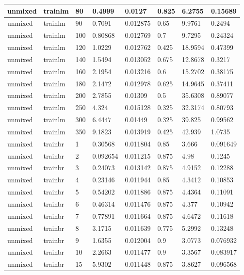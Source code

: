 \begin{longtable}{llllllll}
unmixed & trainlm & 80 & 0.4999 & 0.0127 & 0.825 & 6.2755 & 0.15689 \\ \hline 
unmixed & trainlm & 90 & 0.7091 & 0.012875 & 0.65 & 9.9761 & 0.2494 \\ \hline 
unmixed & trainlm & 100 & 0.80868 & 0.012769 & 0.7 & 9.7295 & 0.24324 \\ \hline 
unmixed & trainlm & 120 & 1.0229 & 0.012762 & 0.425 & 18.9594 & 0.47399 \\ \hline 
unmixed & trainlm & 140 & 1.5494 & 0.013052 & 0.675 & 12.8678 & 0.3217 \\ \hline 
unmixed & trainlm & 160 & 2.1954 & 0.013216 & 0.6 & 15.2702 & 0.38175 \\ \hline 
unmixed & trainlm & 180 & 2.1472 & 0.012978 & 0.625 & 14.9645 & 0.37411 \\ \hline 
unmixed & trainlm & 200 & 2.7855 & 0.01309 & 0.5 & 35.6308 & 0.89077 \\ \hline 
unmixed & trainlm & 250 & 4.324 & 0.015128 & 0.325 & 32.3174 & 0.80793 \\ \hline 
unmixed & trainlm & 300 & 6.4447 & 0.01449 & 0.325 & 39.825 & 0.99562 \\ \hline 
unmixed & trainlm & 350 & 9.1823 & 0.013919 & 0.425 & 42.939 & 1.0735 \\ \hline 
unmixed & trainbr & 1 & 0.30568 & 0.011804 & 0.85 & 3.666 & 0.091649 \\ \hline 
unmixed & trainbr & 2 & 0.092654 & 0.011215 & 0.875 & 4.98 & 0.1245 \\ \hline 
unmixed & trainbr & 3 & 0.24073 & 0.013142 & 0.875 & 4.9152 & 0.12288 \\ \hline 
unmixed & trainbr & 4 & 0.23146 & 0.011944 & 0.85 & 4.3412 & 0.10853 \\ \hline 
unmixed & trainbr & 5 & 0.54202 & 0.011886 & 0.875 & 4.4364 & 0.11091 \\ \hline 
unmixed & trainbr & 6 & 0.46314 & 0.011476 & 0.875 & 4.377 & 0.10942 \\ \hline 
unmixed & trainbr & 7 & 0.77891 & 0.011664 & 0.875 & 4.6472 & 0.11618 \\ \hline 
unmixed & trainbr & 8 & 3.1715 & 0.011639 & 0.775 & 5.2992 & 0.13248 \\ \hline 
unmixed & trainbr & 9 & 1.6355 & 0.012004 & 0.9 & 3.0773 & 0.076932 \\ \hline 
unmixed & trainbr & 10 & 2.2663 & 0.011477 & 0.9 & 3.3567 & 0.083917 \\ \hline 
unmixed & trainbr & 15 & 5.9302 & 0.011448 & 0.875 & 3.8627 & 0.096568 \\ \hline 

\end{longtable}
